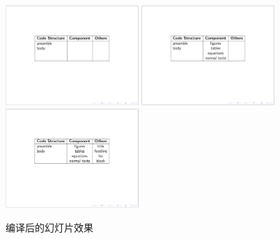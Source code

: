 \begin{figure}[htbp]
    \centering
    \includegraphics[width = 0.45\textwidth]{images/ch_9/example14_1.png}
    \includegraphics[width = 0.45\textwidth]{images/ch_9/example14_2.png}
    \includegraphics[width = 0.45\textwidth]{images/ch_9/example14_3.png}
    \caption{编译后的幻灯片效果}
    \label{fig:940}
\end{figure}

